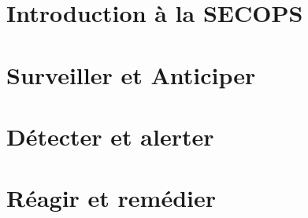 



\chapter{Introduction à la SECOPS}



\chapter{Surveiller et Anticiper}

%
%
%


\chapter{Détecter et alerter}

%
%
%
%
%
% 


\chapter{Réagir et remédier}

%
%
%


